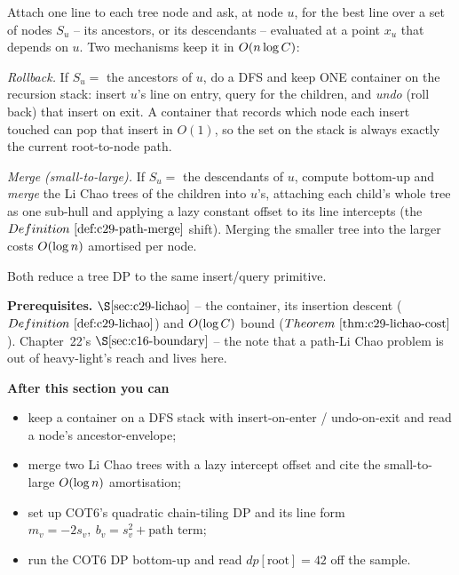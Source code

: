 \begin{topicintro}
Attach one line to each tree node and ask, at node \(u\), for the best line over
a set of nodes \(S_u\) -- its ancestors, or its descendants -- evaluated at a
point \(x_u\) that depends on \(u\).  Two mechanisms keep it in
\(O(n\log C)\):

\emph{Rollback.} If \(S_u=\) the ancestors of \(u\), do a DFS and keep ONE
container on the recursion stack: insert \(u\)'s line on entry, query for the
children, and \emph{undo} (roll back) that insert on exit.  A container that
records which node each insert touched can pop that insert in \(O(1)\), so the
set on the stack is always exactly the current root-to-node path.

\emph{Merge (small-to-large).} If \(S_u=\) the descendants of \(u\), compute
bottom-up and \emph{merge} the Li Chao trees of the children into \(u\)'s,
attaching each child's whole tree as one sub-hull and applying a lazy constant
offset to its line intercepts (the \(\defref{c29-path-merge}\) shift).  Merging
the smaller tree into the larger costs \(O(\log n)\) amortised per node.

Both reduce a tree DP to the same insert/query primitive.

\textbf{Prerequisites.} \(\secref{c29-lichao}\) -- the container, its insertion
descent (\(\defref{c29-lichao}\)) and \(O(\log C)\) bound
(\(\thmref{c29-lichao-cost}\)).  Chapter~22's \(\secref{c16-boundary}\) -- the
note that a path-Li Chao problem is out of heavy-light's reach and lives here.

\textbf{After this section you can}
\begin{itemize}[nosep]
  \item keep a container on a DFS stack with insert-on-enter / undo-on-exit and
        read a node's ancestor-envelope; \hfill{}
  \item merge two Li Chao trees with a lazy intercept offset and cite the
        small-to-large \(O(\log n)\) amortisation; \hfill{}
  \item set up COT6's quadratic chain-tiling DP and its line form
        \(m_v=-2s_v,\ b_v=s_v^2+\text{path term}\); \hfill{}
  \item run the COT6 DP bottom-up and read \(\mathit{dp}[\text{root}]=42\) off
        the sample. \hfill{}
\end{itemize}
\end{topicintro}


